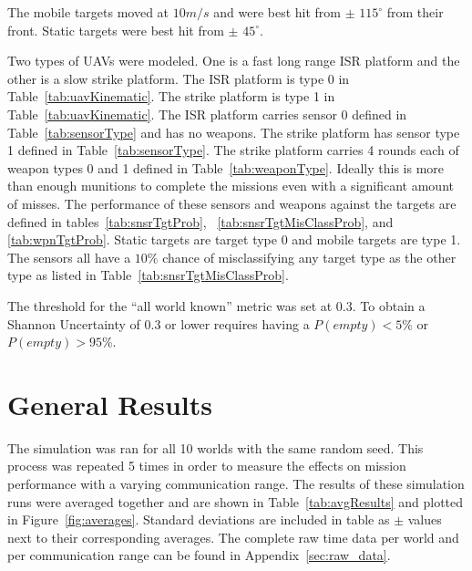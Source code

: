 The mobile targets moved at $10m/s$ and were best hit from $\pm$ $115^{\circ}$ from their front.  Static targets were best hit from $\pm$ $45^{\circ}$.

Two types of UAVs were modeled.  One is a fast long range ISR platform and the other is a slow strike platform.  The ISR platform is type 0 in Table~\ref{tab:uavKinematic}.  The strike platform is type 1 in Table~\ref{tab:uavKinematic}.  The ISR platform carries sensor 0 defined in Table~\ref{tab:sensorType} and has no weapons.  The strike platform has sensor type 1 defined in Table~\ref{tab:sensorType}.  The strike platform carries 4 rounds each of weapon types 0 and 1 defined in Table~\ref{tab:weaponType}.  Ideally this is more than enough munitions to complete the missions even with a significant amount of misses.  The performance of these sensors and weapons against the targets are defined in tables~\ref{tab:snsrTgtProb}, ~\ref{tab:snsrTgtMisClassProb}, and \ref{tab:wpnTgtProb}.  Static targets are target type 0 and mobile targets are type 1.  The sensors all have a $10\%$ chance of misclassifying any target type as the other type as listed in Table~\ref{tab:snsrTgtMisClassProb}.

The threshold for the ``all world known'' metric was set at 0.3. To obtain a Shannon Uncertainty of 0.3 or lower requires having a $P(empty) < 5\%$ or $P(empty) > 95\%$.

\section{General Results}

The simulation was ran for all 10 worlds with the same random seed.  This process was repeated 5 times in order to measure the effects on mission performance with a varying communication range.  The results of these simulation runs were averaged together and are shown in Table~\ref{tab:avgResults} and plotted in Figure~\ref{fig:averages}.  Standard deviations are included in table as $\pm$ values next to their corresponding averages.  The complete raw time data per world and per communication range can be found in Appendix~\ref{sec:raw_data}.


